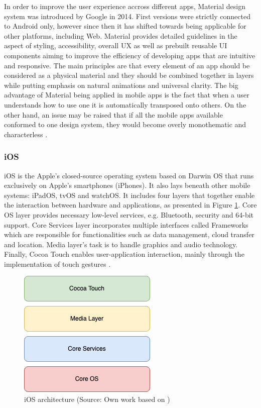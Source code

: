 In order to improve the user experience accross different apps, Material design system was introduced by Google in 2014. First versions were strictly connected to Android only, however since then it has shifted towards being applicable for other platforms, including Web. Material provides detailed guidelines in the aspect of styling, accessibility, overall UX as well as prebuilt reusable UI components aiming to improve the efficiency of developing apps that are intuitive and responsive. The main principles are that every element of an app should be considered as a physical material and they should be combined together in layers while putting emphasis on natural animations and universal clarity. The big advantage of Material being applied in mobile apps is the fact that when a user understands how to use one it is automatically transposed onto others. On the other hand, an issue may be raised that if all the mobile apps available conformed to one design system, they would become overly monothematic and characterless \cite{material_design_get_started}\cite{material_design_pros_cons}.

\subsubsection{iOS}

iOS is the Apple's closed-source operating system based on Darwin OS that runs exclusively on Apple's smartphones (iPhones). It also lays beneath other mobile systems: iPadOS, tvOS and watchOS. It includes four layers that together enable the interaction between hardware and applications, as presented in Figure \ref{fig:ios_architecture}. Core OS layer provides necessary low-level services, e.g. Bluetooth, security and 64-bit support. Core Services layer incorporates multiple interfaces called Frameworks which are responsible for functionalities such as data management, cloud transfer and location. Media layer's task is to handle graphics and audio technology. Finally, Cocoa Touch enables user-application interaction, mainly through the implementation of touch gestures \cite{ios_architecture}\cite{mobile_os_survey}.

\begin{figure}[h]
  \centering
  \includegraphics[scale=0.73]{img/ios_architecture}
  \caption{iOS architecture (Source: Own work based on \cite{ios_architecture})}
  \label{fig:ios_architecture}
\end{figure}

